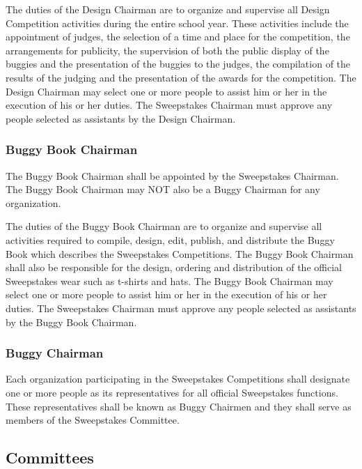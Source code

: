 The duties of the Design Chairman are to organize and supervise all Design Competition activities during the entire school year. These activities include the appointment of judges, the selection of a time and place for the competition, the arrangements for publicity, the supervision of both the public display of the buggies and the presentation of the buggies to the judges, the compilation of the results of the judging and the presentation of the awards for the competition. The Design Chairman may select one or more people to assist him or her in the execution of his or her duties. The Sweepstakes Chairman must approve any people selected as assistants by the Design Chairman.

\subsubsection{Buggy Book Chairman}
The Buggy Book Chairman shall be appointed by the Sweepstakes Chairman. The Buggy Book Chairman may NOT also be a Buggy Chairman for any organization.

The duties of the Buggy Book Chairman are to organize and supervise all activities required to compile, design, edit, publish, and distribute the Buggy Book which describes the Sweepstakes Competitions. The Buggy Book Chairman shall also be responsible for the design, ordering and distribution of the official Sweepstakes wear such as t-shirts and hats. The Buggy Book Chairman may select one or more people to assist him or her in the execution of his or her duties. The Sweepstakes Chairman must approve any people selected as assistants by the Buggy Book Chairman.

\subsubsection{Buggy Chairman}
Each organization participating in the Sweepstakes Competitions shall designate one or more people as its representatives for all official Sweepstakes functions. These representatives shall be known as Buggy Chairmen and they shall serve as members of the Sweepstakes Committee.

\subsection{Committees}

